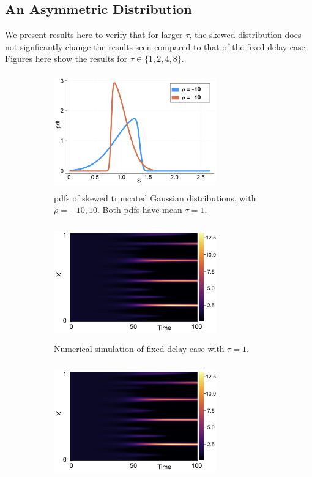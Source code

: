 \subsection{An Asymmetric Distribution}

We present results here to verify that for larger $\tau$, the skewed distribution does not signficantly change the results seen compared to that of the fixed delay case. Figures here show the results for $\tau\in\{1,2,4,8\}$.

\begin{figure}[H]
    \centering
    \begin{subfigure}[t]{0.45\textwidth}
        \centering
        \includegraphics[width=7cm,height=5cm]{skewdist1.png}
        \caption{pdfs of skewed truncated Gaussian distributions, with $\rho=-10,10$. Both pdfs have mean $\tau=1$.}
        \label{}
    \end{subfigure}
    \hfill
    \begin{subfigure}[t]{0.45\textwidth}
        \centering
        \includegraphics[width=7cm,height=5cm]{fixt1.png}
        \caption{Numerical simulation of fixed delay case with $\tau=1$.}
        \label{}
    \end{subfigure}
    \hfill
    \begin{subfigure}[t]{0.45\textwidth}
        \centering
        \includegraphics[width=7cm,height=5cm]{fixt1.png}

\end{subfigure}
\end{figure}
